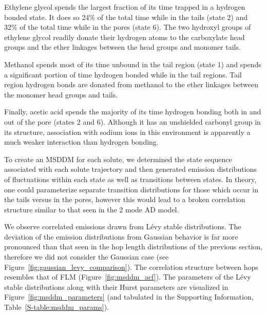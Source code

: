 \documentclass[12pt]{article}
\begin{document}
  Ethylene glycol spends the largest fraction of its time trapped in a hydrogen
  bonded state. It does so 24\% of the total time while in the tails (state 2)
  and 32\% of the total time while in the pores (state 6). The two hydroxyl groups 
  of ethylene glycol readily donate their hydrogen atoms to the carboxylate
  head groups and the ether linkages between the head groups and monomer tails. 
  
  Methanol spends most of its time unbound in the tail region (state 1) and spends a 
  significant portion of time hydrogen bonded while in the tail regions.
  Tail region hydrogen bonds are donated from methanol to the ether linkages between
  the monomer head groups and tails.
  
  Finally, acetic acid spends the majority of its time hydrogen bonding both in and out
  of the pore (states 2 and 6). Although it has an unshielded carbonyl group in its
  structure, association with sodium ions in this environment is apparently a much 
  weaker interaction than hydrogen bonding.
  

  To create an MSDDM for each solute, we determined the state sequence associated
  with each solute trajectory and then generated emission distributions of fluctuations
  within each state as well as transitions between states. In theory, one could 
  parameterize separate transition distributions for those which occur in the tails 
  versus in the pores, however this would lead to a broken correlation structure 
  similar to that seen in the 2 mode AD model.

  We observe correlated emissions drawn from L\'evy stable distributions. The 
  deviation of the emission distributions from Gaussian behavior is far more pronounced
  than that seen in the hop length distributions of the previous section, therefore we 
  did not consider the Gaussian case (see Figure~\ref{fig:gaussian_levy_comparison}).
  The correlation structure between hops resembles that of FLM (Figure~\ref{fig:msddm_acf}).
  The parameters of the L\'evy stable distributions along with their Hurst parameters 
  are visualized in Figure~\ref{fig:msddm_parameters} (and tabulated in the Supporting
  Information, Table~\ref{S-table:msddm_params}). 
  
\end{document}
